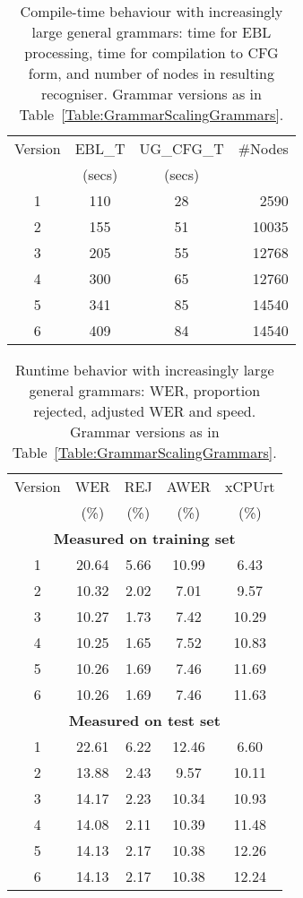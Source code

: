 \documentclass[11pt]{article}
\begin{document}
\begin{table}[h]
\begin{tabular}{|c||c|c|r|}
\hline
Version 	&EBL\_T		&UG\_CFG\_T	&\#Nodes\\
		&(secs)		&(secs)		&	\\
\hline	
\hline	
1		&110		&28		&2590	\\
\hline						
2		&155		&51		&10035	\\
\hline
3		&205		&55		&12768	\\
\hline
4		&300		&65		&12760	\\
\hline
5		&341		&85		&14540 	\\
\hline
6		&409		&84		&14540	\\
\hline
\end{tabular}
\caption{Compile-time behaviour with increasingly large general
grammars: time for EBL processing, time for compilation to CFG
form, and number of nodes in resulting recogniser. Grammar
versions as in Table~\ref{Table:GrammarScalingGrammars}.}
\label{Table:GrammarScalabilityCompilation}
\end{table}

\begin{table}[h]
\begin{tabular}{|c||c|c|c|c|}
\hline
Version 	&WER	&REJ	&AWER	&xCPUrt	\\
		&(\%)	&(\%)	&(\%)	&(\%)	\\
\hline	
\hline	
\multicolumn{5}{|c|}{\bf Measured on training set}\\
\hline
1		&20.64	&5.66	&10.99	&6.43	\\
\hline						
2		&10.32	&2.02	&7.01	&9.57	\\
\hline						
3		&10.27	&1.73	&7.42	&10.29	\\
\hline						
4		&10.25	&1.65	&7.52	&10.83	\\
\hline						
5		&10.26	&1.69	&7.46	&11.69	\\
\hline						
6		&10.26	&1.69	&7.46	&11.63	\\
\hline						
\multicolumn{5}{|c|}{\bf Measured on test set}\\
\hline
1		&22.61	&6.22	&12.46	&6.60	\\
\hline						
2		&13.88	&2.43	&9.57	&10.11	\\
\hline						
3		&14.17	&2.23	&10.34	&10.93	\\
\hline						
4		&14.08	&2.11	&10.39	&11.48	\\
\hline						
5		&14.13	&2.17	&10.38	&12.26	\\
\hline						
6		&14.13	&2.17	&10.38	&12.24	\\
\hline						
\end{tabular}
\caption{Runtime behavior with increasingly large general grammars:
WER, proportion rejected, adjusted WER and speed. Grammar
versions as in Table~\ref{Table:GrammarScalingGrammars}.}
\label{Table:GrammarScalabilityRunTime}
\end{table}
\end{document}
